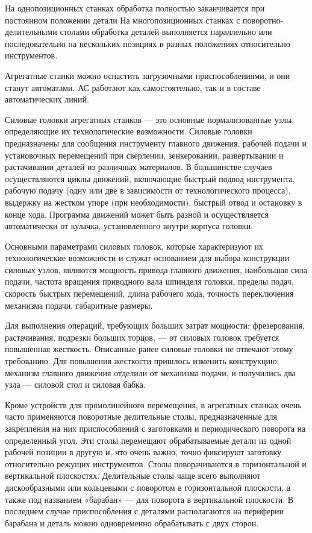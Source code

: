 На однопозиционных станках обработка полностью заканчивается при постоянном положении детали На многопозиционных станках с поворотно-делительными столами обработка деталей выполняется параллельно или последовательно на нескольких позициях в разных положениях относительно инструментов.

Агрегатные станки можно оснастить загрузочными приспособлениями, и они станут автоматами. АС работают как самостоятельно, так и в составе автоматических линий.

Силовые головки агрегатных станков — это основные нормализованные узлы, определяющие их технологические возможности. Силовые головки предназначены для сообщения инструменту главного движения, рабочей подачи и установочных перемещений при сверлении, зенкеровании, развертывании и растачивании деталей из различных материалов. В большинстве случаев осуществляются циклы движений, включающие быстрый подвод инструмента, рабочую подачу (одну или две в зависимости от технологического процесса), выдержку на жестком упоре (при необходимости), быстрый отвод и остановку в конце хода. Программа движений может быть разной и осуществляется автоматически от кулачка, установленного внутри корпуса головки.

Основными параметрами силовых головок, которые характеризуют их технологические возможности и служат основанием для выбора конструкции силовых узлов, являются мощность привода главного движения, наибольшая сила подачи, частота вращения приводного вала шпинделя головки, пределы подач, скорость быстрых перемещений, длина рабочего хода, точность переключения механизма подачи, габаритные размеры.

Для выполнения операций, требующих больших затрат мощности: фрезерования, растачивания, подрезки больших торцов, — от силовых головок требуется повышенная жесткость. Описанные ранее силовые головки не отвечают этому требованию. Для повышения жесткости пришлось изменить конструкцию: механизм главного движения отделили от механизма подачи, и получились два узла — силовой стол и силовая бабка. 

Кроме устройств для прямолинейного перемещения, в агрегатных станках очень часто применяются поворотные делительные столы, предназначенные для закрепления на них приспособлений с заготовками и периодического поворота на определенный угол. Эти столы перемещают обрабатываемые детали из одной рабочей позиции в другую и, что очень важно, точно фиксируют заготовку относительно режущих инструментов. Столы поворачиваются в горизонтальной и вертикальной плоскостях. Делительные столы чаще всего выполняют дискообразными или кольцевыми с поворотом в горизонтальной плоскости, а также под названием «барабан» — для поворота в вертикальной плоскости. В последнем случае приспособления с деталями располагаются на периферии барабана и деталь можно одновременно обрабатывать с двух сторон.

